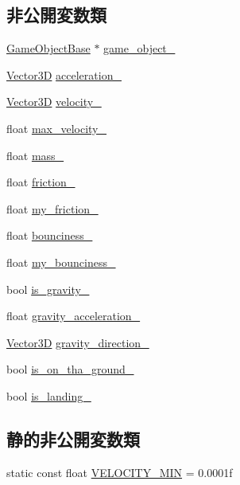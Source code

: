 \subsection*{非公開変数類}
\begin{DoxyCompactItemize}
\item 
\mbox{\hyperlink{class_game_object_base}{Game\+Object\+Base}} $\ast$ \mbox{\hyperlink{class_physics_a43e626ecc90d765a7cbd4c561b19331a}{game\+\_\+object\+\_\+}}
\item 
\mbox{\hyperlink{class_vector3_d}{Vector3D}} \mbox{\hyperlink{class_physics_a8e87f3c364d5d0b8d3fb228237f3ff56}{acceleration\+\_\+}}
\item 
\mbox{\hyperlink{class_vector3_d}{Vector3D}} \mbox{\hyperlink{class_physics_a9818c603a813d8f70254812f43e67b3e}{velocity\+\_\+}}
\item 
float \mbox{\hyperlink{class_physics_a28b0e36d5eec30e1e9ccb1a51c5c6363}{max\+\_\+velocity\+\_\+}}
\item 
float \mbox{\hyperlink{class_physics_a68f81110a54f8ed24ac94b6cd33c3ae0}{mass\+\_\+}}
\item 
float \mbox{\hyperlink{class_physics_a63b2e282267a28f0a160b98d56fa40b6}{friction\+\_\+}}
\item 
float \mbox{\hyperlink{class_physics_a25f0db16668c86e90babbf9233b57511}{my\+\_\+friction\+\_\+}}
\item 
float \mbox{\hyperlink{class_physics_a302b8ad7552303570fa1cfd070bb8588}{bounciness\+\_\+}}
\item 
float \mbox{\hyperlink{class_physics_a6a04fea3f4790f2dfc2301940b8ccb6b}{my\+\_\+bounciness\+\_\+}}
\item 
bool \mbox{\hyperlink{class_physics_ab49b5561a800bec8abcb3d35b1125c4e}{is\+\_\+gravity\+\_\+}}
\item 
float \mbox{\hyperlink{class_physics_af292ed854ca107f1a09a79931b10c3fa}{gravity\+\_\+acceleration\+\_\+}}
\item 
\mbox{\hyperlink{class_vector3_d}{Vector3D}} \mbox{\hyperlink{class_physics_aadfeac1807906f025d97143ba1c0f323}{gravity\+\_\+direction\+\_\+}}
\item 
bool \mbox{\hyperlink{class_physics_a07a6416cab35698692378441c1750c4c}{is\+\_\+on\+\_\+tha\+\_\+ground\+\_\+}}
\item 
bool \mbox{\hyperlink{class_physics_a863e16866ca69201a22365e480b7c74f}{is\+\_\+landing\+\_\+}}
\end{DoxyCompactItemize}
\subsection*{静的非公開変数類}
\begin{DoxyCompactItemize}
\item 
static const float \mbox{\hyperlink{class_physics_a84ba24f3a5b31888a654c6750fb24faf}{V\+E\+L\+O\+C\+I\+T\+Y\+\_\+\+M\+IN}} = 0.\+0001f
\end{DoxyCompactItemize}


